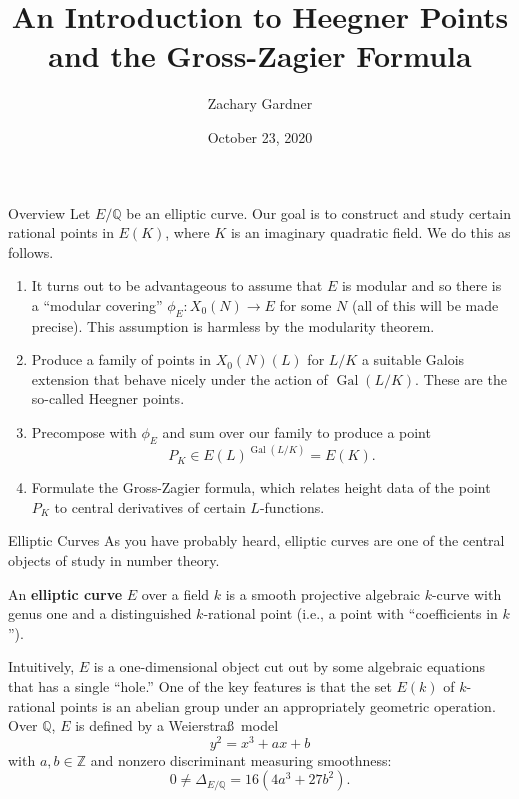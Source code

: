 \documentclass[aspectratio=1610]{beamer}
\title{An Introduction to Heegner Points and the Gross-Zagier Formula}
\author{Zachary Gardner}
\date{October 23, 2020}
\newcommand{\Q}{\mathbb{Q}}
\newcommand{\Z}{\mathbb{Z}}
\DeclareMathOperator{\Gal}{Gal}
\begin{document}
\begin{frame}
\titlepage
\end{frame}

\begin{frame}{Overview}
Let $E/\Q$ be an elliptic curve. Our goal is to construct and study certain rational points in $E(K)$, where $K$ is an imaginary quadratic field. We do this as follows.
\begin{enumerate}
\item It turns out to be advantageous to assume that $E$ is modular and so there is a ``modular covering'' $\phi_E: X_0(N)\to E$ for some $N$ (all of this will be made precise). This assumption is harmless by the modularity theorem.

\item Produce a family of points in $X_0(N)(L)$ for $L/K$ a suitable Galois extension that behave nicely under the action of $\Gal(L/K)$. These are the so-called Heegner points.

\item Precompose with $\phi_E$ and sum over our family to produce a point 
$$P_K\in E(L)^{\Gal(L/K)}=E(K).$$

\item Formulate the Gross-Zagier formula, which relates height data of the point $P_K$ to central derivatives of certain $L$-functions.
\end{enumerate}
\end{frame}

\begin{frame}{Elliptic Curves}
As you have probably heard, elliptic curves are one of the central objects of study in number theory. 
\begin{definition}
An \textbf{elliptic curve} $E$ over a field $k$ is a smooth projective algebraic $k$-curve with genus one and a distinguished $k$-rational point (i.e., a point with ``coefficients in $k$'').
\end{definition}
Intuitively, $E$ is a one-dimensional object cut out by some algebraic equations that has a single ``hole.'' One of the key features is that the set $E(k)$ of $k$-rational points is an abelian group under an appropriately geometric operation. Over $\Q$, $E$ is defined by a Weierstra\ss\, model 
$$y^2=x^3+ax+b$$
with $a,b\in\Z$ and nonzero discriminant measuring smoothness:
$$0\neq\Delta_{E/\Q}=16(4a^3+27b^2).$$ 
\end{frame}
\end{document}
